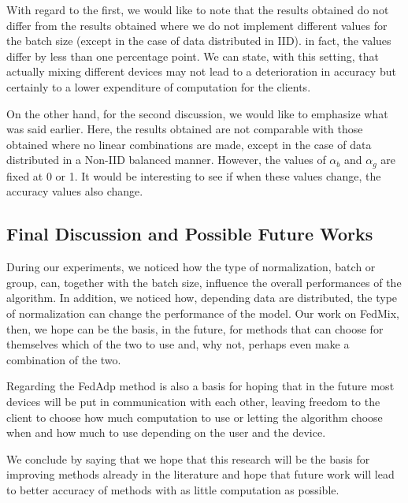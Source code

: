 \documentclass[conference]{IEEEtran}
\begin{document}
With regard to the first, we would like to note that the results obtained do not differ from the results obtained where we do not implement different values for the batch size (except in the case of data distributed in IID). in fact, the values differ by less than one percentage point. We can state, with this setting, that actually mixing different devices may not lead to a deterioration in accuracy but certainly to a lower expenditure of computation for the clients.

On the other hand, for the second discussion, we would like to emphasize what was said earlier. Here, the results obtained are not comparable with those obtained where no linear combinations are made, except in the case of data distributed in a Non-IID balanced manner. However, the values of $\alpha_b$ and $\alpha_g$ are fixed at 0 or 1. It would be interesting to see if when these values change, the accuracy values also change.

\subsection{Final Discussion and Possible Future Works}
During our experiments, we noticed how the type of normalization, batch or group, can, together with the batch size, influence the overall performances of the algorithm. In addition, we noticed how, depending data are distributed, the type of normalization can change the performance of the model. Our work on FedMix, then, we hope can be the basis, in the future, for methods that can choose for themselves which of the two to use and, why not, perhaps even make a combination of the two.

Regarding the FedAdp method is also a basis for hoping that in the future most devices will be put in communication with each other, leaving freedom to the client to choose how much computation to use or letting the algorithm choose when and how much to use depending on the user and the device. 

We conclude by saying that we hope that this research will be the basis for improving methods already in the literature and hope that future work will lead to better accuracy of methods with as little computation as possible.
\end{document}
